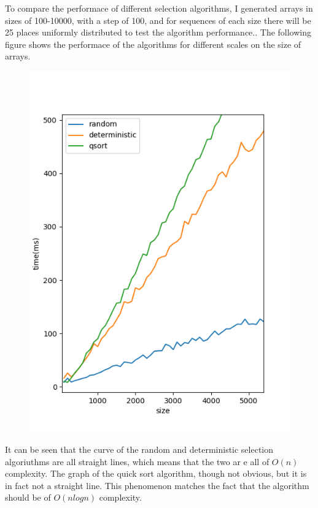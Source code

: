\documentclass{article}
\begin{document}
To compare the performace of different selection algorithms, I generated arrays in sizes of 100-10000, with a step of 100, and for sequences of each size there will be 25 places uniformly distributed to test the algorithm performance.. The following figure shows the performace of the algorithms for different scales on the size of arrays.

\begin{figure}[htbp]
        \centering
        \includegraphics[scale=0.5]{1.png}
\end{figure}

It can be seen that the curve of the random and deterministic selection algoriuthms are all straight lines, which means that the two ar e all of $O(n)$ complexity. The graph of the quick sort algorithm, though not obvious, but it is in fact not a straight line. This phenomenon matches the fact that the algorithm should be of $O(nlogn)$ complexity.
\end{document}
